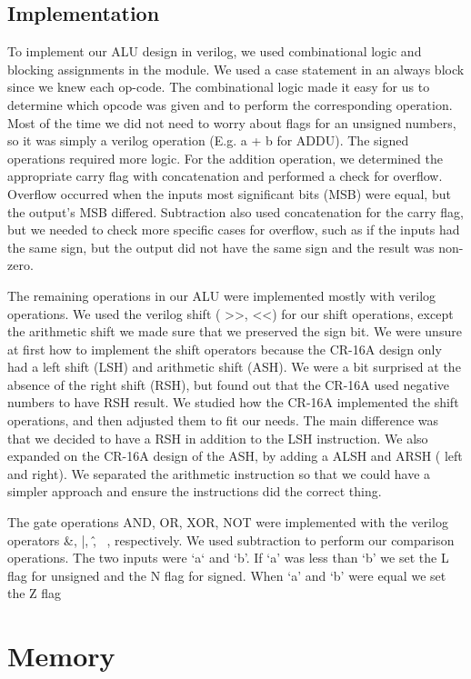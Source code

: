 \documentclass[letterpaper, 11 pt, conference]{article}
\begin{document}
\subsection{Implementation}
To implement our ALU design in verilog, we used combinational logic and blocking assignments in the module. We used a case statement in an always block since we knew each op-code. The combinational logic made it easy for us to determine which opcode was given and to perform the corresponding operation. Most of the time we did not need to worry about flags for  an unsigned numbers, so it was simply a verilog operation (E.g. a + b for ADDU). The signed operations required more logic. For the addition operation, we determined the appropriate carry flag with concatenation and performed a check for overflow. Overflow occurred when the inputs most significant bits (MSB) were equal, but the output’s MSB differed. Subtraction also used concatenation for the carry flag, but we needed to check more specific cases for overflow, such as if the inputs had the same sign, but the output did not have the same sign and the result was non-zero.

The remaining operations in our ALU were implemented mostly with verilog operations. We used the verilog shift ( >>, <<) for our shift operations, except the arithmetic shift we made sure that we preserved the sign bit. We were unsure at first how to implement the shift operators because the CR-16A design only had a left shift  (LSH) and arithmetic shift (ASH). We were a bit surprised at the absence of the right shift (RSH), but found out that the CR-16A used negative numbers to have RSH result.  We studied how the CR-16A implemented the shift operations, and then adjusted them to fit our needs. The main difference was that we decided to have a RSH in addition to the LSH instruction. We also expanded on the CR-16A design of the ASH, by adding a ALSH and ARSH ( left and right). We separated the arithmetic instruction so that we could have a simpler approach and ensure the instructions did the correct thing. 

The gate operations AND, OR, XOR, NOT were implemented with the verilog operators \&, |, \^ , ~, respectively. We used subtraction to perform our comparison operations. The two inputs were ‘a‘ and ‘b’. If ‘a’ was less than ‘b’ we set the L flag for unsigned and the N flag for signed. When ‘a’ and ‘b’ were equal we set the Z flag
\section{Memory}
\end{document}
